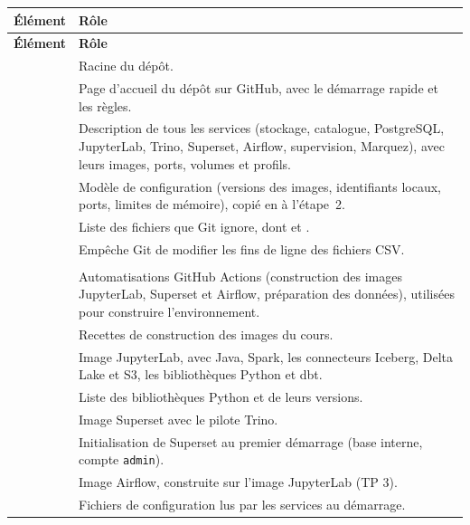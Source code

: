 {\small
\renewcommand{\arraystretch}{1.2}
\begin{xltabular}{\textwidth}{@{}>{\raggedright\arraybackslash}p{5.6cm} >{\raggedright\arraybackslash}X@{}}
\toprule
\textbf{Élément} & \textbf{Rôle} \\
\midrule
\endfirsthead
\toprule
\textbf{Élément} & \textbf{Rôle} \\
\midrule
\endhead
\bottomrule
\endfoot
{} & Racine du dépôt. \\
 & Page d'accueil du dépôt sur GitHub, avec le démarrage rapide et les règles. \\
 & Description de tous les services (stockage, catalogue, PostgreSQL,
  JupyterLab, Trino, Superset, Airflow, supervision, Marquez), avec leurs images, ports, volumes et profils. \\
 & Modèle de configuration (versions des images, identifiants locaux, ports,
  limites de mémoire), copié en  à l'étape~2. \\
 & Liste des fichiers que Git ignore, dont  et . \\
 & Empêche Git de modifier les fins de ligne des fichiers CSV. \\
\addlinespace
{} & \\*
 & Automatisations GitHub Actions (construction des images JupyterLab, Superset et
  Airflow, préparation des données), utilisées pour construire l'environnement. \\
\addlinespace
{} & Recettes de construction des images du cours. \\*
 & Image JupyterLab, avec Java, Spark, les connecteurs Iceberg, Delta Lake
  et S3, les bibliothèques Python et dbt. \\
 & Liste des bibliothèques Python et de leurs versions. \\
 & Image Superset avec le pilote Trino. \\
 & Initialisation de Superset au premier démarrage
  (base interne, compte \texttt{admin}). \\
 & Image Airflow, construite sur l'image JupyterLab (TP 3). \\
\addlinespace
{} & Fichiers de configuration lus par les services au démarrage. \\*

\end{xltabular}}
